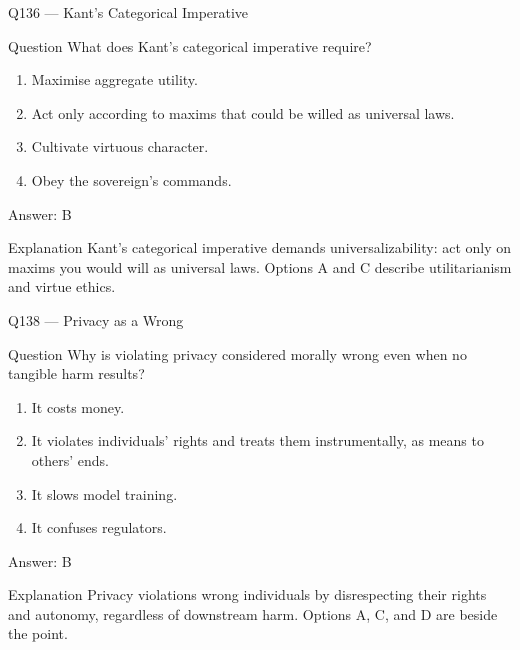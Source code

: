 \documentclass[aspectratio=169,8pt]{beamer}
\begin{document}
\begin{frame}{Q136 --- Kant's Categorical Imperative}
\begin{block}{Question}
What does Kant's categorical imperative require?
\begin{enumerate}
\item Maximise aggregate utility.
\item Act only according to maxims that could be willed as universal laws.
\item Cultivate virtuous character.
\item Obey the sovereign's commands.
\end{enumerate} 	\end{block}
\begin{exampleblock}{Answer: B}\end{exampleblock}
\begin{block}{Explanation}
Kant's categorical imperative demands universalizability: act only on maxims you would will as universal laws. Options A and C describe utilitarianism and virtue ethics.
\end{block}
\end{frame}



\begin{frame}{Q138 --- Privacy as a Wrong}
\begin{block}{Question}
Why is violating privacy considered morally wrong even when no tangible harm results?
\begin{enumerate}
\item It costs money.
\item It violates individuals' rights and treats them instrumentally, as means to others' ends.
\item It slows model training.
\item It confuses regulators.
\end{enumerate} 	\end{block}
\begin{exampleblock}{Answer: B}\end{exampleblock}
\begin{block}{Explanation}
Privacy violations wrong individuals by disrespecting their rights and autonomy, regardless of downstream harm. Options A, C, and D are beside the point.
\end{block}
\end{frame}
\end{document}

